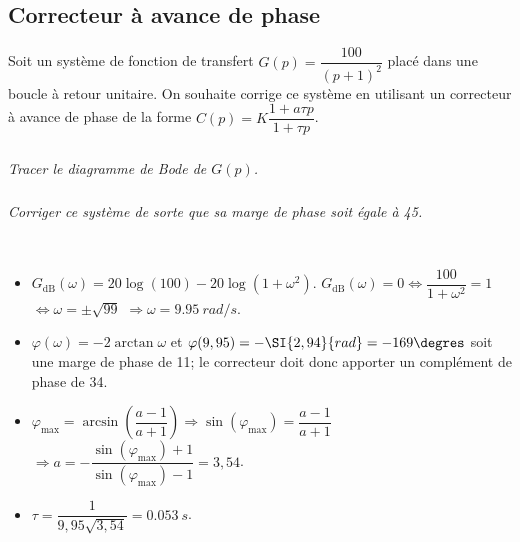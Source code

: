 \begin{multicols}{2}
\subsection*{Correcteur à avance de phase}
\setcounter{exo}{0}
Soit un système de fonction de transfert $G(p)=\dfrac{100}{\left(p+1\right)^2}$ placé dans une boucle à retour unitaire. On souhaite corrige ce système en utilisant un correcteur à avance de phase de la forme $C(p)=K\dfrac{1+a\tau p}{1+\tau p}$.


\subparagraph{}\textit{Tracer le diagramme de Bode de $G(p)$.}


\subparagraph{}\textit{Corriger ce système de sorte que sa marge de phase soit égale à 45\degres.}
\ifprof
\begin{corrige}~\\
\begin{itemize}
\item $G_{\text{dB}}(\omega)=20\log \left(100\right)-20\log\left(1+\omega^2\right)$. $G_{\text{dB}}(\omega)=0 \Leftrightarrow \dfrac{100}{1+\omega^2}=1$ $  \Leftrightarrow \omega=\pm\sqrt{99}$ $\Rightarrow \omega=\SI{9,95}{rad/s}$.
\item $\varphi(\omega)=-2\arctan\omega$ et $\varphi(9,95)=-\SI{2,94}{rad}=-169\degres$ soit une marge de phase de 11\degres; le correcteur doit donc apporter un complément de phase de 34\degres. 
\item $\varphi_{\text{max}}=\arcsin\left( \dfrac{a-1}{a+1}\right)\Rightarrow \sin \left(\varphi_{\text{max}}\right)=\dfrac{a-1}{a+1}$ 
$\Rightarrow a=-\dfrac{\sin \left(\varphi_{\text{max}}\right)+1}{ \sin \left(\varphi_{\text{max}}\right) -1}=3,54$.
\item $\tau=\dfrac{1}{9,95\sqrt{3,54}}=\SI{0,053}{s}$.
\end{itemize}
\end{corrige}
\else
\fi



\end{multicols}
